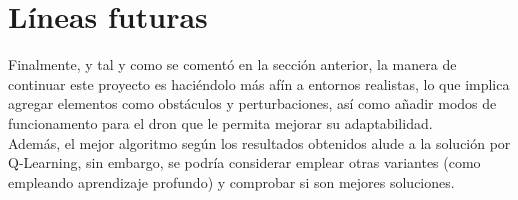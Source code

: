 \section{Líneas futuras}
\label{sec:lineas_futuras}

Finalmente, y tal y como se comentó en la sección anterior, la manera de continuar este proyecto es haciéndolo más afín a entornos realistas, lo que implica agregar elementos como obstáculos y perturbaciones, así como añadir modos de funcionamento para el dron que le permita mejorar su adaptabilidad.\\

Además, el mejor algoritmo según los resultados obtenidos alude a la solución por Q-Learning, sin embargo, se podría considerar emplear otras variantes (como empleando aprendizaje profundo) y comprobar si son mejores soluciones.